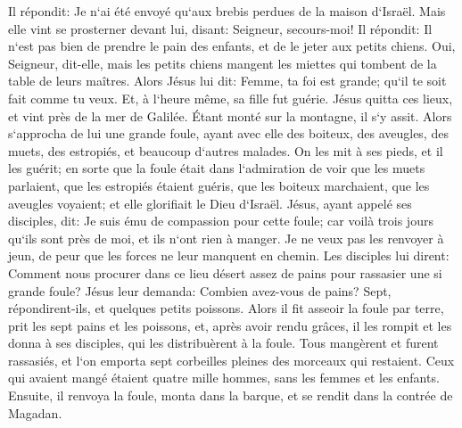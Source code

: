 \verse Il répondit: Je n`ai été envoyé qu`aux brebis perdues de la maison d`Israël. 
\verse Mais elle vint se prosterner devant lui, disant: Seigneur, secours-moi! 
\verse Il répondit: Il n`est pas bien de prendre le pain des enfants, et de le jeter aux petits chiens. 
\verse Oui, Seigneur, dit-elle, mais les petits chiens mangent les miettes qui tombent de la table de leurs maîtres. 
\verse Alors Jésus lui dit: Femme, ta foi est grande; qu`il te soit fait comme tu veux. Et, à l`heure même, sa fille fut guérie. 
\verse Jésus quitta ces lieux, et vint près de la mer de Galilée. Étant monté sur la montagne, il s`y assit. 
\verse Alors s`approcha de lui une grande foule, ayant avec elle des boiteux, des aveugles, des muets, des estropiés, et beaucoup d`autres malades. On les mit à ses pieds, et il les guérit; 
\verse en sorte que la foule était dans l`admiration de voir que les muets parlaient, que les estropiés étaient guéris, que les boiteux marchaient, que les aveugles voyaient; et elle glorifiait le Dieu d`Israël. 
\verse Jésus, ayant appelé ses disciples, dit: Je suis ému de compassion pour cette foule; car voilà trois jours qu`ils sont près de moi, et ils n`ont rien à manger. Je ne veux pas les renvoyer à jeun, de peur que les forces ne leur manquent en chemin. 
\verse Les disciples lui dirent: Comment nous procurer dans ce lieu désert assez de pains pour rassasier une si grande foule? 
\verse Jésus leur demanda: Combien avez-vous de pains? Sept, répondirent-ils, et quelques petits poissons. 
\verse Alors il fit asseoir la foule par terre, 
\verse prit les sept pains et les poissons, et, après avoir rendu grâces, il les rompit et les donna à ses disciples, qui les distribuèrent à la foule. 
\verse Tous mangèrent et furent rassasiés, et l`on emporta sept corbeilles pleines des morceaux qui restaient. 
\verse Ceux qui avaient mangé étaient quatre mille hommes, sans les femmes et les enfants. 
\verse Ensuite, il renvoya la foule, monta dans la barque, et se rendit dans la contrée de Magadan. 

\chapter{}

